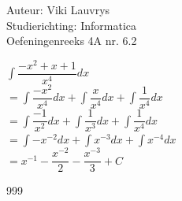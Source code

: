 \documentclass[a4paper]{article}
\begin{document}
  
\noindent \large Auteur: Viki	Lauvrys \\
\noindent \large Studierichting: Informatica\\
\noindent \large Oefeningenreeks 4A nr. 6.2\\

\medskip

\normalsize

$\displaystyle\int \dfrac{-x^2 + x + 1}{x^4}dx $ \\

$ = \displaystyle \int \dfrac{-x^2}{x^4} dx +\displaystyle \int \dfrac{x}{x^4} dx + \displaystyle \int \dfrac{1}{x^4} dx $ \\

$ = \displaystyle \int \dfrac{-1}{x^2} dx +\displaystyle \int \dfrac{1}{x^3} dx + \displaystyle \int \dfrac{1}{x^4} dx $ \\

$ = \displaystyle \int -x^{-2} dx +\displaystyle \int x^{-3} dx + \displaystyle \int x^{-4} dx $ \\

$ = x^{-1} - \dfrac{x^{-2}}{2} - \dfrac{x^{-3}}{3} + C $ \\

\begin{thebibliography}{999}
\end{thebibliography}
\end{document}
